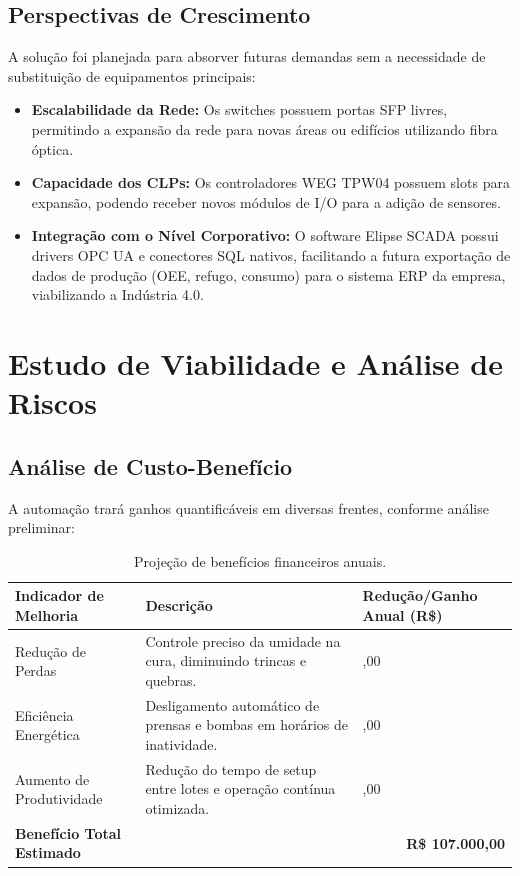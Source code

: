 \documentclass[12pt,a4paper]{article}
\begin{document}
\subsection{Perspectivas de Crescimento}
A solução foi planejada para absorver futuras demandas sem a necessidade de substituição de equipamentos principais:
\begin{itemize}
    \item \textbf{Escalabilidade da Rede:} Os switches possuem portas SFP livres, permitindo a expansão da rede para novas áreas ou edifícios utilizando fibra óptica.
    \item \textbf{Capacidade dos CLPs:} Os controladores WEG TPW04 possuem slots para expansão, podendo receber novos módulos de I/O para a adição de sensores.
    \item \textbf{Integração com o Nível Corporativo:} O software Elipse SCADA possui drivers OPC UA e conectores SQL nativos, facilitando a futura exportação de dados de produção (OEE, refugo, consumo) para o sistema ERP da empresa, viabilizando a Indústria 4.0.
\end{itemize}

\section{Estudo de Viabilidade e Análise de Riscos}

\subsection{Análise de Custo-Benefício}
A automação trará ganhos quantificáveis em diversas frentes, conforme análise preliminar:

\begin{table}[h]
\centering
\begin{tabular}{@{}p{5cm}p{5cm}>{\raggedleft\arraybackslash}p{3cm}@{}}
\toprule
\textbf{Indicador de Melhoria} & \textbf{Descrição} & \textbf{Redução/Ganho Anual (R\$)} \\
\midrule
Redução de Perdas & Controle preciso da umidade na cura, diminuindo trincas e quebras. & 35.000,00 \\
\midrule
Eficiência Energética & Desligamento automático de prensas e bombas em horários de inatividade. & 12.000,00 \\
\midrule
Aumento de Produtividade & Redução do tempo de setup entre lotes e operação contínua otimizada. & 60.000,00 \\
\midrule
\textbf{Benefício Total Estimado} & \multicolumn{2}{r}{\textbf{R\$ 107.000,00}} \\
\bottomrule
\end{tabular}
\caption{Projeção de benefícios financeiros anuais.}
\end{table}
\end{document}
